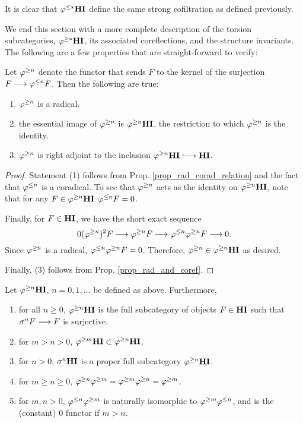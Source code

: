 It is clear that $\varphi^{\leq *}\mathbf{HI}$ define the same strong cofiltration as
defined previously. 

We end this section with a more complete description of the 
torsion subcategories, $\varphi^{\geq *}\mathbf{HI}$, its associated coreflections, and
the structure invariants. The following are a few properties that 
are straight-forward to verify:

\begin{prop} 
Let $\varphi^{\geq n}$ denote the functor that sends $F$ to the kernel of
the surjection $F \longrightarrow \varphi^{\leq n}F$. Then the following are true:
\begin{enumerate}
\item $\varphi^{\geq n}$ is a radical.
\tinyskip

\item the essential image of $\varphi^{\geq n}$ is $\varphi^{\geq n}\mathbf{HI}$, the 
restriction to which $\varphi^{\geq n}$ is the identity.
\tinyskip

\item $\varphi^{\geq n}$ is right adjoint to the inclusion $\THI{n} \into 
\HI$.
\tinyskip
\end{enumerate}
\end{prop}
\begin{proof}
Statement (1) follows from Prop. \ref{prop_rad_corad_relation} and
the fact that $\varphi^{\leq n}$ is a coradical. To see that $\varphi^{\geq n}$
acts as the identity on $\varphi^{\geq n}\mathbf{HI}$, note that for any $F \in \varphi^{\geq n}\mathbf{HI}$
$\varphi^{\leq n} F = 0$. 

Finally, for $F \in \mathbf{HI}$, we have the short exact sequence
\[
0 (\varphi^{\geq n})^2 F \longrightarrow \varphi^{\geq n}F \longrightarrow \varphi^{\leq n} \varphi^{\geq n}F \longrightarrow 0.
\]
Since $\varphi^{\geq n}$ is a radical, $\varphi^{\leq n} \varphi^{\geq n}F = 0$. Therefore,
$\varphi^{\geq n} \in \varphi^{\geq n}\mathbf{HI}$ as desired.

Finally, (3) follows from Prop. \ref{prop_rad_and_coref}.
\end{proof}

\begin{prop}\label{prop_THI_properties}
Let $\varphi^{\geq n}\mathbf{HI}$, $n = 0, 1,\dots$ be defined as above. Furthermore,

\begin{enumerate}
\item for all $n \geq 0$, $\varphi^{\geq n}\mathbf{HI}$ is the full subcategory of
objects $F \in \mathbf{HI}$ such that $\sigma^{n}F \longrightarrow F$ is surjective.
\tinyskip

\item for $m > n > 0$, $\varphi^{\geq m}\mathbf{HI} \subset \varphi^{\geq n}\mathbf{HI}$.
\tinyskip

\item for $n > 0$, $\sigma^{n} \mathbf{HI}$ is a proper full subcategory 
$\varphi^{\geq n}\mathbf{HI}$.
\tinyskip

\item for $m \geq n \geq 0$, $\varphi^{\geq n}\varphi^{\geq m} = \varphi^{\geq m}\varphi^{\geq n} =
\varphi^{\geq m}$.
\tinyskip

\item for $m, n > 0$, $\varphi^{\leq n}\varphi^{\geq m}$ is naturally isomorphic 
to $\varphi^{\geq m}\varphi^{\leq n}$, and is the (constant) $0$ functor if $m > n$.
\tinyskip

\end{enumerate}
\end{prop}


